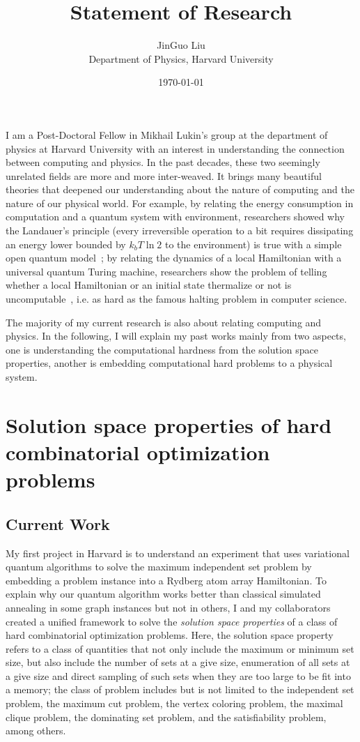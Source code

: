 \documentclass[a4paper]{article}
\title{Statement of Research}
\author{JinGuo Liu\\ Department of Physics, Harvard University}
\date{\today}
\newcommand{\<}{\langle}
\renewcommand{\>}{\rangle}
\begin{document}
\fontsize{10}{13}
\selectfont
\maketitle

I am a Post-Doctoral Fellow in Mikhail Lukin's group at the department of physics at Harvard University with an interest in understanding the connection between computing and physics.
In the past decades, these two seemingly unrelated fields are more and more inter-weaved.
It brings many beautiful theories that deepened our understanding about the nature of computing and the nature of our physical world.
For example, 
by relating the energy consumption in computation and a quantum system with environment, researchers showed why the Landauer's principle (every irreversible operation to a bit requires dissipating an energy lower bounded by $k_bT\ln 2$ to the environment) is true with a simple open quantum model~\cite{Reeb2014};
by relating the dynamics of a local Hamiltonian with a universal quantum Turing machine, researchers show the problem of telling whether a local Hamiltonian or an initial state thermalize or not is uncomputable~\cite{Shiraishi2021}, i.e. as hard as the famous halting problem in computer science.

The majority of my current research is also about relating computing and physics.
In the following, I will explain my past works mainly from two aspects, one is understanding the computational hardness from the solution space properties, another is embedding computational hard problems to a physical system.

\section{Solution space properties of hard combinatorial optimization problems}
\subsection{Current Work}
My first project in Harvard is to understand an experiment that uses variational quantum algorithms to solve the maximum independent set problem by embedding a problem instance into a Rydberg atom array Hamiltonian.
To explain why our quantum algorithm works better than classical simulated annealing in some graph instances but not in others,
I and my collaborators created a unified framework to solve the \textit{solution space properties} of a class of hard combinatorial optimization problems. Here, the solution space property refers to a class of quantities that not only include the maximum or minimum set size, but also include the number of sets at a give size, enumeration of all sets at a give size and direct sampling of such sets when they are too large to be fit into a memory; the class of problem includes but is not limited to the independent set problem, the maximum cut problem, the vertex coloring problem, the maximal clique problem, the dominating set problem, and the satisfiability problem, among others.
\end{document}
